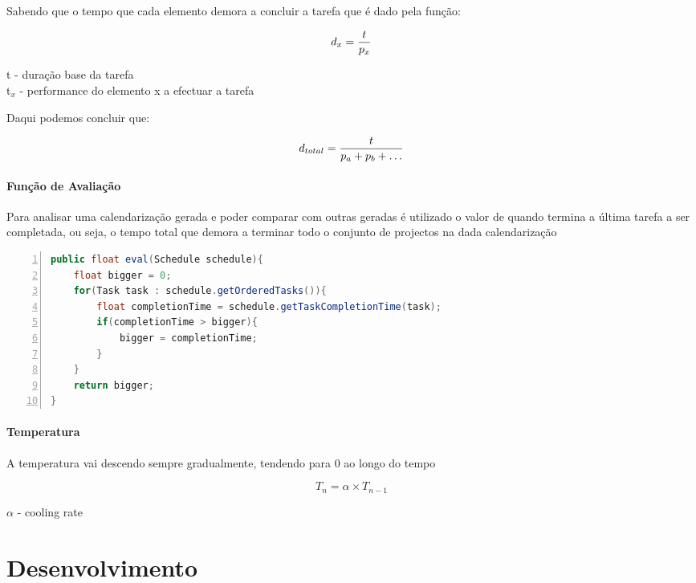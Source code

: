 \begin{titlepage}
\begin{mycapequ}[!ht]
 \caption{Sabendo que o tempo que cada elemento demora a concluir a tarefa que é dado pela função: }
  \begin{equation}
  d_{x}  = {t \over p_x } 
  \end{equation}
  \caption{ 	 t   -  duração base da tarefa \\
   		 t$_x$ -  performance do elemento x a efectuar a tarefa}
\end{mycapequ}


\begin{mycapequ}[!ht]
  \caption{Daqui podemos concluir que:}
  \begin{equation}
   d_{total}  = { t \over p_a  + p_b  +\ldots }
  \end{equation}
\end{mycapequ}

\paragraph{Função de Avaliação}
Para analisar uma calendarização gerada e poder comparar com outras geradas é utilizado o valor de quando termina a última tarefa a ser completada, ou seja, o tempo total que demora a terminar todo o conjunto de projectos na dada calendarização  

\begin{lstlisting}[frame=single, language=java,numbers=left,numberfirstline=true] 
public float eval(Schedule schedule){
	float bigger = 0;
	for(Task task : schedule.getOrderedTasks()){
		float completionTime = schedule.getTaskCompletionTime(task);
		if(completionTime > bigger){
			bigger = completionTime;
		}
	}
	return bigger;
}
\end{lstlisting}

\paragraph{Temperatura}
A temperatura vai descendo sempre gradualmente, tendendo para 0 ao longo do tempo

\begin{mycapequ}[!ht]

  \begin{equation}
  T_{n}  = \alpha \times T_{n-1}
  \end{equation}
   \caption{ $\alpha$ - cooling rate}
\end{mycapequ}

\section{Desenvolvimento}


\end{titlepage}
